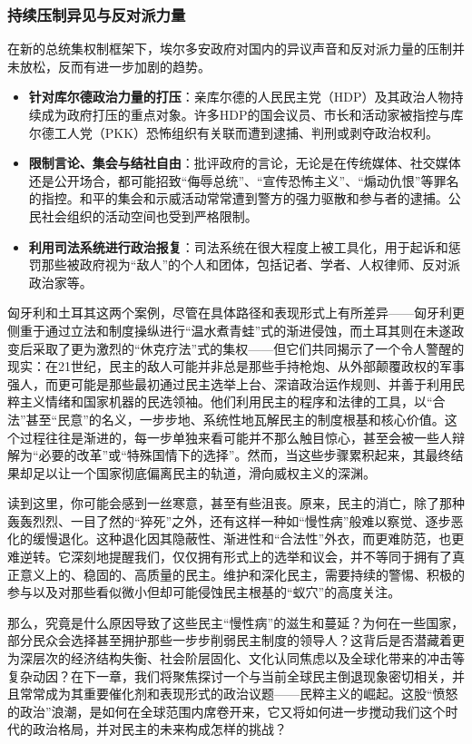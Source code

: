 \documentclass[UTF8, 10pt]{ctexbook}
\begin{document}
\subsubsection{持续压制异见与反对派力量}
在新的总统集权制框架下，埃尔多安政府对国内的异议声音和反对派力量的压制并未放松，反而有进一步加剧的趋势。
\begin{itemize}
    \item \textbf{针对库尔德政治力量的打压}：亲库尔德的人民民主党（HDP）及其政治人物持续成为政府打压的重点对象。许多HDP的国会议员、市长和活动家被指控与库尔德工人党（PKK）恐怖组织有关联而遭到逮捕、判刑或剥夺政治权利。
    \item \textbf{限制言论、集会与结社自由}：批评政府的言论，无论是在传统媒体、社交媒体还是公开场合，都可能招致“侮辱总统”、“宣传恐怖主义”、“煽动仇恨”等罪名的指控。和平的集会和示威活动常常遭到警方的强力驱散和参与者的逮捕。公民社会组织的活动空间也受到严格限制。
    \item \textbf{利用司法系统进行政治报复}：司法系统在很大程度上被工具化，用于起诉和惩罚那些被政府视为“敌人”的个人和团体，包括记者、学者、人权律师、反对派政治家等。
\end{itemize}
匈牙利和土耳其这两个案例，尽管在具体路径和表现形式上有所差异——匈牙利更侧重于通过立法和制度操纵进行“温水煮青蛙”式的渐进侵蚀，而土耳其则在未遂政变后采取了更为激烈的“休克疗法”式的集权——但它们共同揭示了一个令人警醒的现实：在21世纪，民主的敌人可能并非总是那些手持枪炮、从外部颠覆政权的军事强人，而更可能是那些最初通过民主选举上台、深谙政治运作规则、并善于利用民粹主义情绪和国家机器的民选领袖。他们利用民主的程序和法律的工具，以“合法”甚至“民意”的名义，一步步地、系统性地瓦解民主的制度根基和核心价值。这个过程往往是渐进的，每一步单独来看可能并不那么触目惊心，甚至会被一些人辩解为“必要的改革”或“特殊国情下的选择”。然而，当这些步骤累积起来，其最终结果却足以让一个国家彻底偏离民主的轨道，滑向威权主义的深渊。

读到这里，你可能会感到一丝寒意，甚至有些沮丧。原来，民主的消亡，除了那种轰轰烈烈、一目了然的“猝死”之外，还有这样一种如“慢性病”般难以察觉、逐步恶化的缓慢退化。这种退化因其隐蔽性、渐进性和“合法性”外衣，而更难防范，也更难逆转。它深刻地提醒我们，仅仅拥有形式上的选举和议会，并不等同于拥有了真正意义上的、稳固的、高质量的民主。维护和深化民主，需要持续的警惕、积极的参与以及对那些看似微小但却可能侵蚀民主根基的“蚁穴”的高度关注。

那么，究竟是什么原因导致了这些民主“慢性病”的滋生和蔓延？为何在一些国家，部分民众会选择甚至拥护那些一步步削弱民主制度的领导人？这背后是否潜藏着更为深层次的经济结构失衡、社会阶层固化、文化认同焦虑以及全球化带来的冲击等复杂动因？在下一章，我们将聚焦探讨一个与当前全球民主倒退现象密切相关，并且常常成为其重要催化剂和表现形式的政治议题——民粹主义的崛起。这股“愤怒的政治”浪潮，是如何在全球范围内席卷开来，它又将如何进一步搅动我们这个时代的政治格局，并对民主的未来构成怎样的挑战？
\end{document}
